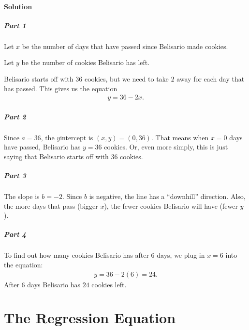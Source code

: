 \documentclass[letterpaper,10pt,english]{jupyterBook}
\begin{document}
\paragraph{Solution}
\label{\detokenize{Ch8 Correlation and Linear Regression/8.2 Linear Equations:id2}}

\subparagraph{Part 1}
\label{\detokenize{Ch8 Correlation and Linear Regression/8.2 Linear Equations:id3}}
\sphinxAtStartPar
Let \(x\) be the number of days that have passed since Belisario made cookies.

\sphinxAtStartPar
Let \(y\) be the number of cookies Belisario has left.

\sphinxAtStartPar
Belisario starts off with \(36\) cookies, but we need to take \(2\) away for each day that has passed. This gives us the equation
\begin{equation*}
\begin{split} y = 36 - 2x. \end{split}
\end{equation*}

\subparagraph{Part 2}
\label{\detokenize{Ch8 Correlation and Linear Regression/8.2 Linear Equations:id4}}
\sphinxAtStartPar
Since \(a = 36\), the \(y\)\sphinxhyphen{}intercept is \((x, y) = (0, 36)\). That means when \(x = 0\) days have passed, Belisario has \(y = 36\) cookies. Or, even more simply, this is just saying that Belisario starts off with \(36\) cookies.


\subparagraph{Part 3}
\label{\detokenize{Ch8 Correlation and Linear Regression/8.2 Linear Equations:id5}}
\sphinxAtStartPar
The slope is \(b = -2\). Since \(b\) is negative, the line has a “downhill” direction. Also, the more days that pass (bigger \(x\)), the fewer cookies Belisario will have (fewer \(y\)).


\subparagraph{Part 4}
\label{\detokenize{Ch8 Correlation and Linear Regression/8.2 Linear Equations:id6}}
\sphinxAtStartPar
To find out how many cookies Belisario has after \(6\) days, we plug in \(x = 6\) into the equation:
\begin{equation*}
\begin{split} y = 36 - 2(6) = 24. \end{split}
\end{equation*}
\sphinxAtStartPar
After \(6\) days Belisario has \(24\) cookies left.

\sphinxstepscope


\section{The Regression Equation}
\label{\detokenize{Ch8 Correlation and Linear Regression/8.3 The Regression Equation:the-regression-equation}}\label{\detokenize{Ch8 Correlation and Linear Regression/8.3 The Regression Equation::doc}}
\end{document}
